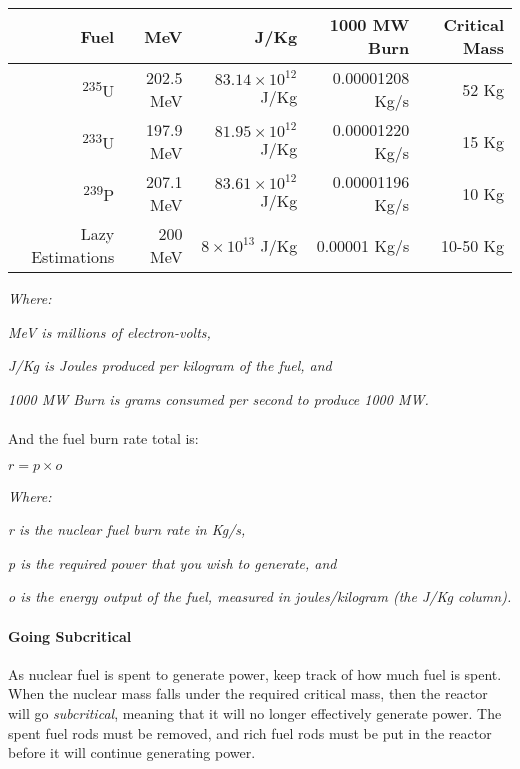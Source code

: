 \vspace{1\baselineskip}
\begin{tabular}{| r | r | r | r | r |}

\hline

Fuel & MeV & J/Kg & 1000 MW Burn & Critical Mass\\

\hline

\textsuperscript{235}U & 202.5 MeV & $83.14 \times 10^{12}$ J/Kg & 0.00001208 Kg/s & 52 Kg\\

\textsuperscript{233}U & 197.9 MeV & $81.95 \times 10^{12}$ J/Kg & 0.00001220 Kg/s & 15 Kg\\

\textsuperscript{239}P & 207.1 MeV & $83.61 \times 10^{12}$ J/Kg & 0.00001196 Kg/s & 10 Kg\\

Lazy Estimations & 200 MeV & $8 \times 10^{13}$ J/Kg & 0.00001 Kg/s & 10-50 Kg\\

\hline

\end{tabular}
\vspace{1\baselineskip}

\par
\textit{Where:}
\par
\textit{MeV is millions of electron-volts,}
\par
\textit{J/Kg is Joules produced per kilogram of the fuel, and}
\par
\textit{1000 MW Burn is grams consumed per second to produce 1000 MW.}

\paragraph{}
And the fuel burn rate total is:

$r = p \times o$

\par
\textit{Where:}
\par
\textit{r is the nuclear fuel burn rate in Kg/s,}
\par
\textit{p is the required power that you wish to generate, and}
\par
\textit{o is the energy output of the fuel, measured in joules/kilogram (the J/Kg column).}

\paragraph{Going Subcritical}As nuclear fuel is spent to generate power, keep track of how much fuel is spent. When the nuclear mass falls under the required critical mass, then the reactor will go \textit{subcritical}, meaning that it will no longer effectively generate power. The spent fuel rods must be removed, and rich fuel rods must be put in the reactor before it will continue generating power.

